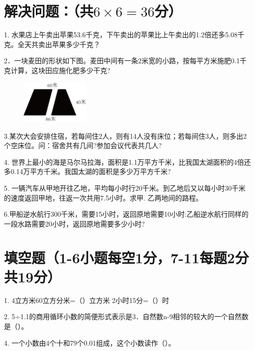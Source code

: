 \documentclass{../source/Paper}
\begin{document}
\section{解决问题：（共$6\times 6=36$分）}

1. 水果店上午卖出苹果53.6千克，下午卖出的苹果比上午卖出的1.2倍还多5.08千克。全天共卖出苹果多少千克？
\vspace{3cm}

2．一块麦田的形状如下图。麦田中间有一条2米宽的小路，按每平方米施肥0.1千克计算，这块田应施化肥多少干克?
\begin{figure}[H]
    \includegraphics[width = 0.3\textwidth]{pic/5.2.png}
\end{figure}
\vspace{1CM}
3.某次大会安排住宿，若每间住2人，则有14人没有床位；若每间住3人，则多出2个空床位。问：宿舍共有几间?参加会议代表共几人?
\vspace{3cm}

4. 世界上最小的海是马尔马拉海，面积是1.1万平方千米，比我国太湖面积的4倍还多0.14万平方千米。我国太湖的面积是多少万平方千米?
\vspace{3cm}

5. 一辆汽车从甲地开往乙地，平均每小时行20千米。到乙地后又以每小时30千米的速度返回甲地，往返一次共用7.5小时。求甲. 乙两地间的路程。
\vspace{3cm}

6.甲船逆水航行300千米，需要15小时，返回原地需要10小时:乙船逆水航行同样的一段水路需要20小时，返回原地需要多少小时?
\vspace{3cm}

\setcounter{section}{0}
\setcounter{figure}{0}

\section{填空题（1-6小题每空1分，7-11每题2分共19分）}

1. 4立方米60立方分米=（\qquad）立方米 \hspace{2cm}2小时15分=（\qquad）时

2. 5÷1.1的商用循环小数的简便形式表示是3．自然数n-9相邻的较大的一个自然数是（\qquad）。

4. 一个小数由4个十和79个0.01组成，这个小数读作（\qquad）。
\end{document}
